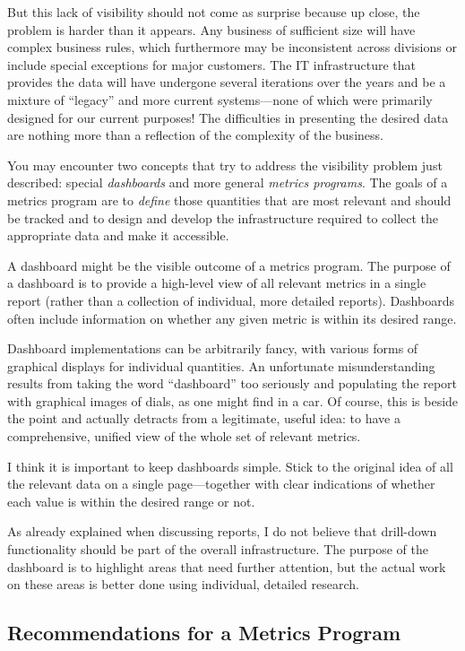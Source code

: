 But this lack of visibility should not come as surprise because up
close, the problem is harder than it appears. Any business of
sufficient size will have complex business rules, which furthermore
may be inconsistent across divisions or include special exceptions for
major customers. The IT infrastructure that provides the data will
have undergone several iterations over the years and be a mixture of
``legacy'' and more current systems---none of which were primarily
designed for our current purposes! The difficulties in presenting the
desired data are nothing more than a reflection of the complexity of
the business.
    
You may encounter two concepts that try to address the visibility
problem just described: special \emph{dashboards} and more general
\emph{metrics programs}. The goals of a metrics program are to
\emph{define} those quantities that are most relevant and should be
tracked and to design and develop the infrastructure required to
collect the appropriate data and make it accessible.

A dashboard might be the visible outcome of a metrics program. The
purpose of a dashboard is to provide a high-level view of all relevant
metrics in a single report (rather than a collection of individual,
more detailed reports). Dashboards often include information on
whether any given metric is within its desired range.
    
Dashboard implementations can be arbitrarily fancy, with various forms
of graphical displays for individual quantities. An unfortunate
misunderstanding results from taking the word ``dashboard'' too
seriously and populating the report with graphical images of dials, as
one might find in a car. Of course, this is beside the point and
actually detracts from a legitimate, useful idea: to have a
comprehensive, unified view of the whole set of relevant metrics.
    
I think it is important to keep dashboards simple. Stick to the
original idea of all the relevant data on a single page---together
with clear indications of whether each value is within the desired
range or not.

As already explained when discussing reports, I do not believe that
drill-down functionality should be part of the overall\vadjust{\vfill\pagebreak}
infrastructure. The purpose of the dashboard is to highlight areas that need further
attention, but the actual work on these areas is better done using
individual, detailed research.
      
\subsection{Recommendations for a Metrics Program}
          
